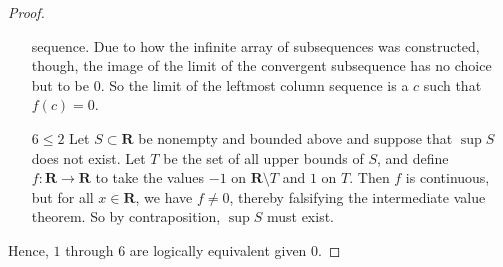 \documentclass[oneside, 12pt]{memoir}
\theoremstyle{elegant}
\theoremstyle{elegant}
\def\RR{\mathbf R}
\begin{document}
\begin{proof}
\begin{itemize}
sequence. Due to how the infinite array of subsequences was constructed, though, the image of the limit of the convergent subsequence
has no choice but to be $0$. So the limit of the leftmost column sequence is a $c$ such that $f(c) = 0$.
\item[$6\le 2$] Let $S\subset\RR$ be nonempty and bounded above and suppose
that $\sup S$ does not exist. Let $T$ be the set of all upper bounds
of $S$, and define $f:\RR\to\RR$ to take the values $-1$ on $\RR\setminus T$
and $1$ on $T$. Then $f$ is continuous, but for all $x\in\RR$, we have $f\ne 0$,
thereby falsifying the intermediate value theorem.
So by contraposition, $\sup S$ must exist.
\end{itemize}
Hence, $1$ through $6$ are logically equivalent given $0$.
\end{proof}
\end{document}
